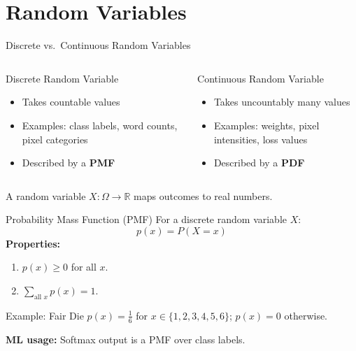 \section{Random Variables}

\begin{frame}{Discrete vs.\ Continuous Random Variables}
\begin{columns}[T]
\begin{block}{Discrete Random Variable}
\begin{itemize}
    \item Takes countable values
    \item Examples: class labels, word counts, pixel categories
    \item Described by a \textbf{PMF}
\end{itemize}
\end{block}
\begin{block}{Continuous Random Variable}
\begin{itemize}
    \item Takes uncountably many values
    \item Examples: weights, pixel intensities, loss values
    \item Described by a \textbf{PDF}
\end{itemize}
\end{block}
\end{columns}
\vspace{6pt}
\centering
A random variable $X: \Omega \to \mathbb{R}$ maps outcomes to real numbers.
\end{frame}

\begin{frame}{Probability Mass Function (PMF)}
For a discrete random variable $X$:
\[
p(x) = P(X = x)
\]
\textbf{Properties:}
\begin{enumerate}
    \item $p(x) \geq 0$ for all $x$.
    \item $\displaystyle\sum_{\text{all } x} p(x) = 1$.
\end{enumerate}
\begin{exampleblock}{Example: Fair Die}
$p(x) = \frac{1}{6}$ for $x \in \{1,2,3,4,5,6\}$; \quad $p(x) = 0$ otherwise.
\end{exampleblock}
\textbf{ML usage:} Softmax output is a PMF over class labels.
\end{frame}

